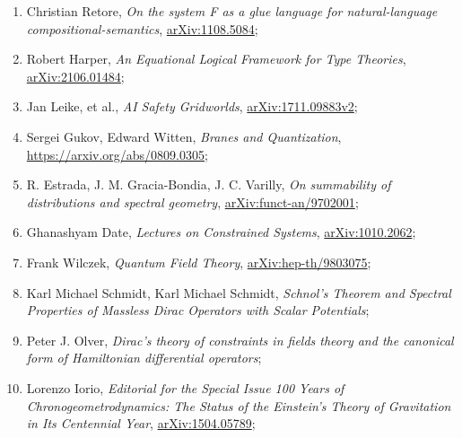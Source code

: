 \documentclass[a4paper,11pt]{article}
\begin{document}
\begin{enumerate}
\item Christian Retore, \textit{On the system F as a glue language for
    natural-language compositional-semantics},
  \href{https://arxiv.org/abs/1108.5084}{arXiv:1108.5084};



\item Robert Harper, \textit{An Equational Logical Framework for Type
    Theories},
  \href{https://arxiv.org/abs/2106.01484}{arXiv:2106.01484};



\item Jan Leike, et al., \textit{AI Safety Gridworlds},
  \href{https://arxiv.org/abs/1711.09883}{arXiv:1711.09883v2};



\item Sergei Gukov, Edward Witten, \textit{Branes and Quantization},
  \href{https://arxiv.org/abs/0809.0305}{https://arxiv.org/abs/0809.0305};



\item R. Estrada, J. M. Gracia-Bondia, J. C. Varilly, \textit{On
    summability of distributions and spectral geometry},
  \href{https://arxiv.org/abs/funct-an/9702001v1}{arXiv:funct-an/9702001};



\item Ghanashyam Date, \textit{Lectures on Constrained Systems},
  \href{https://arxiv.org/abs/1010.2062v1}{arXiv:1010.2062};



\item Frank Wilczek, \textit{Quantum Field Theory},
  \href{https://arxiv.org/abs/hep-th/9803075v2}{arXiv:hep-th/9803075};



\item Karl Michael Schmidt, Karl Michael Schmidt, \textit{Schnol’s
    Theorem and Spectral Properties of Massless Dirac Operators with
    Scalar Potentials};



\item Peter J. Olver, \textit{Dirac’s theory of constraints in fields
    theory and the canonical form of Hamiltonian differential
    operators};



\item Lorenzo Iorio, \textit{Editorial for the Special Issue 100 Years
    of Chronogeometrodynamics: The Status of the Einstein's Theory of
    Gravitation in Its Centennial Year},
  \href{https://arxiv.org/abs/1504.05789v2}{arXiv:1504.05789};




\end{enumerate}
\end{document}
